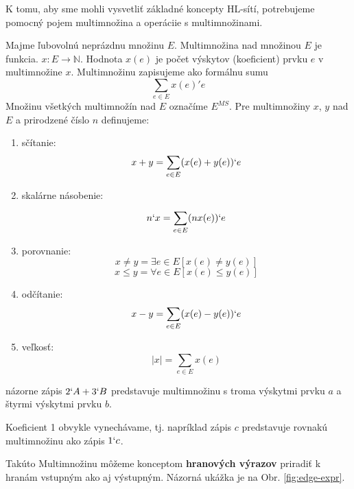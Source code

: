 K tomu, aby sme mohli vysvetliť základné koncepty HL-sítí, potrebujeme pomocný pojem multimnožina a operáciie s multimnožinami.
\begin{defn}
	Majme ľubovolnú neprázdnu množinu $E$. Multimnožina nad množinou $E$ je funkcia. $x : E \longrightarrow \mathbb{N}$. Hodnota $x(e)$ je počet výskytov (koeficient) prvku $e$ v multimnožine $x$. Multimnožinu zapisujeme ako formálnu sumu 
	$$ \sum_{e \in E} x(e)'e $$
	Množinu všetkých multimnožín nad $E$ označíme $E^{MS}$. Pre multimnožiny $x$, $y$ nad $E$ a prirodzené číslo $n$ definujeme:
	
	\begin{enumerate}
		\item sčítanie: $$x + y = \sum_{e \in E} (x(e) + y (e))`e$$
		\item skalárne násobenie: $$n`x = \sum_{e \in E}^{} (n x(e))`e$$
		\item porovnanie:
		$$ x \neq y = \exists e \in E [x(e) \neq y(e) ]$$
		$$ x \leq y = \forall e \in E [x(e) \leq y(e) ]$$
		\item odčítanie: $$x - y = \sum_{e \in E} (x(e) - y (e))`e$$
		\item veľkosť: $$|x| = \sum_{e \in E} x(e)$$
	\end{enumerate}
\end{defn}

\begin{exmpl}
	názorne zápis $2`A + 3`B$ predstavuje multimnožinu s troma výskytmi prvku $a$ a štyrmi výskytmi prvku $b$.
\end{exmpl}

\begin{note}
	Koeficient 1 obvykle vynechávame, tj. napríklad zápis $c$ predstavuje rovnakú multimnožinu ako zápis $1`c$.
\end{note}

Takúto Multimnožinu môžeme konceptom \textbf{hranových výrazov} priradiť k hranám vstupným ako aj výstupným. Názorná ukážka je na Obr. \ref{fig:edge-expr}.

